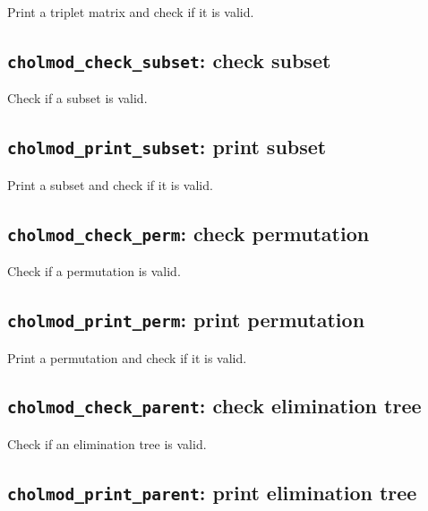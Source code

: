 \documentclass[11pt]{article}
\begin{document}

Print a triplet matrix and check if it is valid.

\subsection{{\tt cholmod\_check\_subset}: check subset}


Check if a subset is valid.

\subsection{{\tt cholmod\_print\_subset}: print subset}


Print a subset and check if it is valid.

\subsection{{\tt cholmod\_check\_perm}: check permutation}


Check if a permutation is valid.

\subsection{{\tt cholmod\_print\_perm}: print permutation}


Print a permutation and check if it is valid.

\subsection{{\tt cholmod\_check\_parent}: check elimination tree}


Check if an elimination tree is valid.

\subsection{{\tt cholmod\_print\_parent}: print elimination tree}
\end{document}
